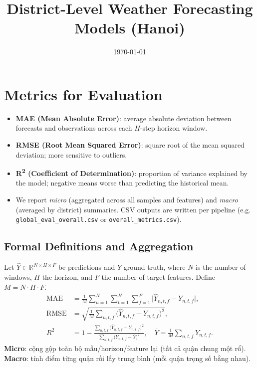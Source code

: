 \documentclass[12pt,a4paper]{article}
\title{District-Level Weather Forecasting Models (Hanoi)}
\author{}
\date{\today}
\begin{document}
\maketitle

\section{Metrics for Evaluation}
\begin{itemize}
    \item \textbf{MAE (Mean Absolute Error)}: average absolute deviation between forecasts and observations across each $H$-step horizon window.
    \item \textbf{RMSE (Root Mean Squared Error)}: square root of the mean squared deviation; more sensitive to outliers.
    \item \textbf{R\textsuperscript{2} (Coefficient of Determination)}: proportion of variance explained by the model; negative means worse than predicting the historical mean.
    \item We report \textit{micro} (aggregated across all samples and features) and \textit{macro} (averaged by district) summaries. CSV outputs are written per pipeline (e.g. \texttt{global\_eval\_overall.csv} or \texttt{overall\_metrics.csv}).
\end{itemize}

\subsection*{Formal Definitions and Aggregation}
Let $\hat{Y} \in \mathbb{R}^{N\times H\times F}$ be predictions and $Y$ ground truth, where $N$ is the number of windows, $H$ the horizon, and $F$ the number of target features. Define $M=N\cdot H\cdot F$.
\begin{align*}
\mathrm{MAE} &= \frac{1}{M} \sum_{n=1}^{N} \sum_{t=1}^{H} \sum_{f=1}^{F} \big|\hat{Y}_{n,t,f} - Y_{n,t,f}\big|,\\
\mathrm{RMSE} &= \sqrt{\frac{1}{M} \sum_{n,t,f} \big(\hat{Y}_{n,t,f} - Y_{n,t,f}\big)^2},\\
R^2 &= 1 - \frac{\sum_{n,t,f} \big(\hat{Y}_{n,t,f} - Y_{n,t,f}\big)^2}{\sum_{n,t,f} \big(Y_{n,t,f} - \overline{Y}\big)^2},\quad \overline{Y}=\frac{1}{M}\sum_{n,t,f} Y_{n,t,f}.
\end{align*}
\textbf{Micro}: cộng gộp toàn bộ mẫu/horizon/feature lại (tất cả quận chung một rổ). \textbf{Macro}: tính điểm từng quận rồi lấy trung bình (mỗi quận trọng số bằng nhau).
\end{document}
